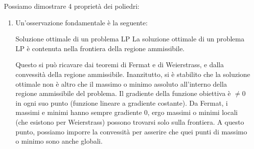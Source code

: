 \documentclass[a4paper,11pt]{article}
\begin{document}
Possiamo dimostrare 4 proprietà dei poliedri:

\begin{enumerate}
	\item 
		Un'osservazione fondamentale è la seguente:
		\begin{theorem}{Soluzione ottimale di un problema LP}
			La soluzione ottimale di un problema LP è contenuta nella frontiera della regione ammissibile.
		\end{theorem}
		Questo si può ricavare dai teoremi di Fermat e di Weierstrass, e dalla convessità della regione ammissibile.
		Inanzitutto, si è stabilito che la soluzione ottimale non è altro che il massimo o minimo assoluto all'interno della regione ammissibile del problema.
		Il gradiente della funzione obiettiva è $\neq 0$ in ogni suo punto (funzione lineare a gradiente costante). 
		Da Fermat, i massimi e minimi hanno sempre gradiente $0$, ergo massimi o minimi locali (che esistono per Weierstrass) possono trovarsi solo sulla frontiera.
		A questo punto, possiamo imporre la convessità per asserire che quei punti di massimo o minimo sono anche globali. 


\end{enumerate}
\end{document}
